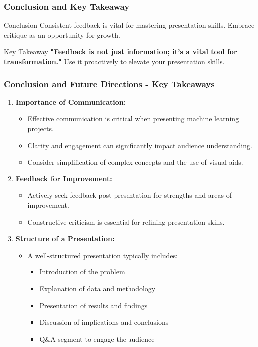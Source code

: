 \documentclass[aspectratio=169]{beamer}
\begin{document}
\begin{frame}[fragile]
    \frametitle{Conclusion and Key Takeaway}
    \begin{block}{Conclusion}
        Consistent feedback is vital for mastering presentation skills. Embrace critique as an opportunity for growth.
    \end{block}

    \begin{block}{Key Takeaway}
        \textbf{"Feedback is not just information; it’s a vital tool for transformation."} Use it proactively to elevate your presentation skills.
    \end{block}
\end{frame}

\begin{frame}[fragile]
    \frametitle{Conclusion and Future Directions - Key Takeaways}
    
    \begin{enumerate}
        \item \textbf{Importance of Communication:}
        \begin{itemize}
            \item Effective communication is critical when presenting machine learning projects.
            \item Clarity and engagement can significantly impact audience understanding.
            \item Consider simplification of complex concepts and the use of visual aids.
        \end{itemize}
        
        \item \textbf{Feedback for Improvement:}
        \begin{itemize}
            \item Actively seek feedback post-presentation for strengths and areas of improvement.
            \item Constructive criticism is essential for refining presentation skills.
        \end{itemize}
        
        \item \textbf{Structure of a Presentation:}
        \begin{itemize}
            \item A well-structured presentation typically includes:
            \begin{itemize}
                \item Introduction of the problem
                \item Explanation of data and methodology
                \item Presentation of results and findings
                \item Discussion of implications and conclusions
                \item Q\&A segment to engage the audience
            \end{itemize}
        \end{itemize}
        

\end{enumerate}
\end{frame}
\end{document}
